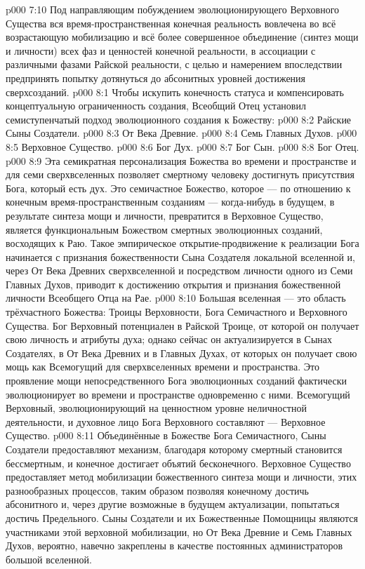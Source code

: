 \vs p000 7:10 Под направляющим побуждением эволюционирующего Верховного Существа вся время\hyp{}пространственная конечная реальность вовлечена во всё возрастающую мобилизацию и всё более совершенное объединение (синтез мощи и личности) всех фаз и ценностей конечной реальности, в ассоциации с различными фазами Райской реальности, с целью и намерением впоследствии предпринять попытку дотянуться до абсонитных уровней достижения сверхсозданий.
\vs p000 8:1 Чтобы искупить конечность статуса и компенсировать концептуальную ограниченность создания, Всеобщий Отец установил семиступенчатый подход эволюционного создания к Божеству:
\vs p000 8:2 Райские Сыны Создатели.
\vs p000 8:3 От Века Древние.
\vs p000 8:4 Семь Главных Духов.
\vs p000 8:5 Верховное Существо.
\vs p000 8:6 Бог Дух.
\vs p000 8:7 Бог Сын.
\vs p000 8:8 Бог Отец.
\vs p000 8:9 \pc Эта семикратная персонализация Божества во времени и пространстве и для семи сверхвселенных позволяет смертному человеку достигнуть присутствия Бога, который есть дух. Это семичастное Божество, которое --- по отношению к конечным время\hyp{}пространственным созданиям --- когда\hyp{}нибудь в будущем, в результате синтеза мощи и личности, превратится в Верховное Существо, является функциональным Божеством смертных эволюционных созданий, восходящих к Раю. Такое эмпирическое открытие\hyp{}продвижение к реализации Бога начинается с признания божественности Сына Создателя локальной вселенной и, через От Века Древних сверхвселенной и посредством личности одного из Семи Главных Духов, приводит к достижению открытия и признания божественной личности Всеобщего Отца на Рае.
\vs p000 8:10 \pc Большая вселенная --- это область трёхчастного Божества: Троицы Верховности, Бога Семичастного и Верховного Существа. Бог Верховный потенциален в Райской Троице, от которой он получает свою личность и атрибуты духа; однако сейчас он актуализируется в Сынах Создателях, в От Века Древних и в Главных Духах, от которых он получает свою мощь как Всемогущий для сверхвселенных времени и пространства. Это проявление мощи непосредственного Бога эволюционных созданий фактически эволюционирует во времени и пространстве одновременно с ними. Всемогущий Верховный, эволюционирующий на ценностном уровне неличностной деятельности, и духовное лицо Бога Верховного составляют  --- Верховное Существо.
\vs p000 8:11 Объединённые в Божестве Бога Семичастного, Сыны Создатели предоставляют механизм, благодаря которому смертный становится бессмертным, и конечное достигает объятий бесконечного. Верховное Существо предоставляет метод мобилизации божественного синтеза мощи и личности,  этих разнообразных процессов, таким образом позволяя конечному достичь абсонитного и, через другие возможные в будущем актуализации, попытаться достичь Предельного. Сыны Создатели и их Божественные Помощницы являются участниками этой верховной мобилизации, но От Века Древние и Семь Главных Духов, вероятно, навечно закреплены в качестве постоянных администраторов большой вселенной.
